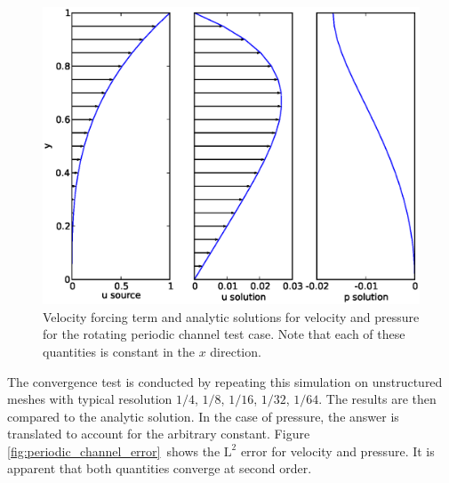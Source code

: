 \begin{figure}[ht]
  \centering
  \onlypdf{\begin{pdfdisplay}}
    \includegraphics[width=1.1\textwidth]{examples_images/rotating_channel/analytic_solution.eps}
  \onlypdf{\end{pdfdisplay}}
  \caption{Velocity forcing term and analytic solutions for velocity and
    pressure for the rotating periodic channel test case. Note that each of
    these quantities is constant in the $x$ direction.}
  \label{fig:periodic_channel}
\end{figure}

The convergence test is conducted by repeating this simulation on unstructured meshes
with typical resolution $1/4$, $1/8$, $1/16$, $1/32$, $1/64$. The results
are then compared to the analytic solution. In the case of pressure, the
answer is translated to account for the arbitrary constant. Figure
\ref{fig:periodic_channel_error}\ shows the $\textrm{L}^2$ error for
velocity and pressure. It is apparent that both quantities converge at
second order.

